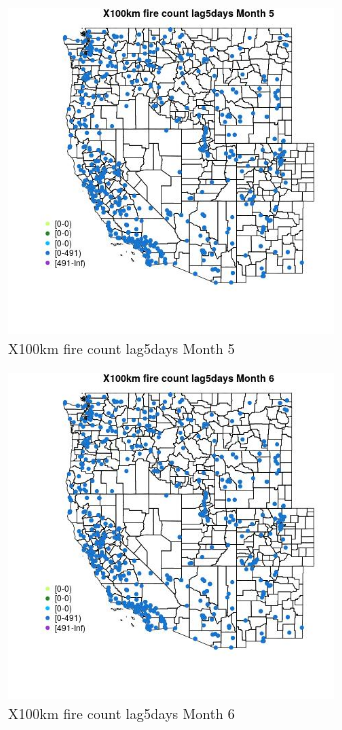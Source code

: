 \begin{figure} 
\centering  
\includegraphics[width=0.77\textwidth]{Code_Outputs/Report_ML_input_PM25_Step4_part_e_de_duplicated_aves_compiled_2019-05-14wNAs_MapObsMo5X100km_fire_count_lag5days.jpg} 
\caption{\label{fig:Report_ML_input_PM25_Step4_part_e_de_duplicated_aves_compiled_2019-05-14wNAsMapObsMo5X100km_fire_count_lag5days}X100km fire count lag5days Month 5} 
\end{figure} 
 

\begin{figure} 
\centering  
\includegraphics[width=0.77\textwidth]{Code_Outputs/Report_ML_input_PM25_Step4_part_e_de_duplicated_aves_compiled_2019-05-14wNAs_MapObsMo6X100km_fire_count_lag5days.jpg} 
\caption{\label{fig:Report_ML_input_PM25_Step4_part_e_de_duplicated_aves_compiled_2019-05-14wNAsMapObsMo6X100km_fire_count_lag5days}X100km fire count lag5days Month 6} 
\end{figure} 
 

